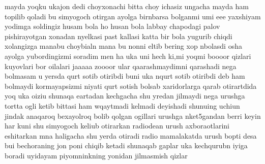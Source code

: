 mayda yoqku ukajon dedi choyxonachi bitta choy ichasiz ungacha mayda ham topilib qoladi bu simyogoch otirgan ayolga birnbarsa bolganmi umi eee yaxshiyam yodimga soldingiz husam bola ho husan bola labbay chapodagi palov pishirayotgan xonadan nyelkasi past kallasi katta bir bola yugurib chiqdi xolangizga manabu choybialn mana bu nonni eltib bering xop nbolasdi osha ayolga yubordingizmi soradim men ha uka uni hech ki,mi yoqmi boooor qizlari kuyovlari bor oilalari jaaaaa zoooor ular qaarashmaydimni qarashadi nega bolmasam u yersda qurt sotib otiribdi buni uka nqurt sotib otiribdi deb ham bolmaydi kormayapsizmi niyati qurt sotish bolsab xaridorlarga qarab otirartdida yoq uka oiziu shunaqa eartadan kechgacha shu yredan jilmaydi nega urushga tortta ogli ketib bittasi ham wqaytmadi kelmadi deyishadi shunuing uchiun jindak anaqaroq bexayolroq bolib qolgan ogillari urushga nket5gandan berri keyin har kuni shu simyogoch keliub otirarkan radiodean urush axboraotlarini eshitarkan mna haligacha shu yerda otiradi radio mamalakatda urush bopti desa bui bechoraning jon poni chiqib ketadi shunaqab  gaplar uka kechqurubn iyiga boradi uyidayam piyomninkning yonidan jilmasmish qizlar 